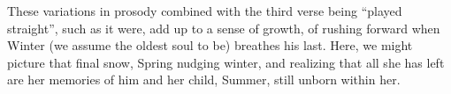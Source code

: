 \documentclass{memoir}
\begin{document}
These variations in prosody combined with the third verse being ``played straight'', such as it were, add up to a sense of growth, of rushing forward when Winter (we assume the oldest soul to be) breathes his last. Here, we might picture that final snow, Spring nudging winter, and realizing that all she has left are her memories of him and her child, Summer, still unborn within her.

\printbibliography
\end{document}

